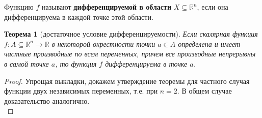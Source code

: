\documentclass[12pt]{report}
\numberwithin{equation}{section}
\newtheorem{theorem}{Теорема}[section]
\begin{document}
Функцию $f$ называют \textbf{дифференцируемой в области} $X \subseteq \mathbb{R}^n$, если она дифференцируема в каждой точке этой области.\\

\begin{theorem}[достаточное условие дифференцируемости] \label{th:37:1}
Если скалярная функция $f : A \subseteq \mathbb{R}^n \to \mathbb{R}$ в некоторой окрестности точки $a \in A$ определена и имеет частные производные по всем переменных, причем все производные непрерывны в самой точке $a$, то функция $f$ дифференцируема в точке $a$.
\end{theorem}

\begin{proof}
Упрощая выкладки, докажем утверждение теоремы для частного случая функции двух независимых переменных, т.е. при $n = 2$. В общем случае доказательство аналогично.\\


\end{proof}
\end{document}
